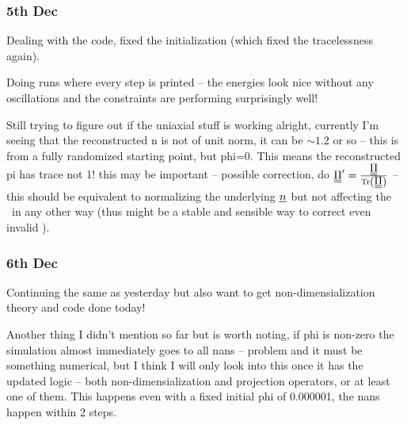 \documentclass[11pt]{article}
\begin{document}
\subsubsection*{5th Dec}
Dealing with the code, fixed the initialization (which fixed the tracelessness again).

Doing runs where every step is printed -- the energies look nice without any oscillations and the constraints are performing surprisingly well!

Still trying to figure out if the uniaxial stuff is working alright, currently I'm seeing that the reconstructed n is not of unit norm, it can be ${\sim}1.2$ or so -- this is from a fully randomized starting point, but phi=0.
This means the reconstructed pi has trace not 1! this may be important -- possible correction, do $\du{\Pi}' = \frac{\du{\Pi}}{\Tr(\du{\Pi})}$ -- this should be equivalent to normalizing the underlying $\su{n}$ but not affecting the \PP\ in any other way (thus might be a stable and sensible way to correct even invalid \PP).

\subsubsection*{6th Dec}
Continuing the same as yesterday but also want to get non-dimensialization theory and code done today!

Another thing I didn't mention so far but is worth noting, if phi is non-zero the simulation almost immediately goes to all nans -- problem and it must be something numerical, but I think I will only look into this once it has the updated logic -- both non-dimensialization and projection operators, or at least one of them.
This happens even with a fixed initial phi of 0.000001, the nans happen within 2 steps.
\end{document}

